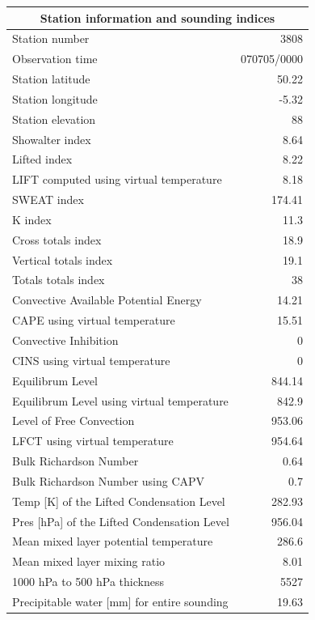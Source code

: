 \documentclass{article}
\begin{document}
\begin{longtable}{l|r}
\multicolumn{2}{c}{\textbf{Station information and sounding indices}} \\ \hline
Station number & 3808 \\
Observation time & \multicolumn{1}{l}{ 070705/0000} \\
Station latitude & 50.22 \\
Station longitude & -5.32 \\
Station elevation & 88 \\
Showalter index & 8.64 \\
Lifted index & 8.22 \\
LIFT computed using virtual temperature & 8.18 \\
SWEAT index & 174.41 \\
K index & 11.3 \\
Cross totals index & 18.9 \\
Vertical totals index & 19.1 \\
Totals totals index & 38 \\
Convective Available Potential Energy & 14.21 \\
CAPE using virtual temperature & 15.51 \\
Convective Inhibition & 0 \\
CINS using virtual temperature & 0 \\
Equilibrum Level & 844.14 \\
Equilibrum Level using virtual temperature & 842.9 \\
Level of Free Convection & 953.06 \\
LFCT using virtual temperature & 954.64 \\
Bulk Richardson Number & 0.64 \\
Bulk Richardson Number using CAPV & 0.7 \\
Temp [K] of the Lifted Condensation Level & 282.93 \\
Pres [hPa] of the Lifted Condensation Level & 956.04 \\
Mean mixed layer potential temperature & 286.6 \\
Mean mixed layer mixing ratio & 8.01 \\
1000 hPa to 500 hPa thickness & 5527 \\
Precipitable water [mm] for entire sounding & 19.63 \\
\end{longtable}%


\newpage
\end{document}
